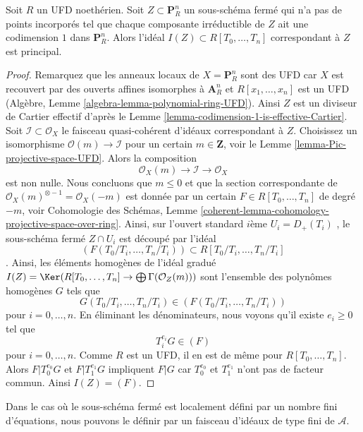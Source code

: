 \begin{lemma}
\label{lemma-equation-codim-1-in-projective-space}
Soit  $R$  un UFD noethérien. Soit  $Z \subset \mathbf{P}^n_R$  un sous-schéma fermé qui
n'a pas de points incorporés tel que chaque composante irréductible de
 $Z$  ait une codimension  $1$  dans  $\mathbf{P}^n_R$. Alors l'idéal
 $I(Z) \subset R[T_0, \ldots, T_n]$  correspondant à  $Z$  est principal.
\end{lemma}

\begin{proof}
Remarquez que les anneaux locaux de  $X = \mathbf{P}^n_R$  sont des UFD car  $X$  est
recouvert par des ouverts affines isomorphes à  $\mathbf{A}^n_R$  et  $R[x_1, \ldots, x_n]$  est un
UFD (Algèbre, Lemme  \ref{algebra-lemma-polynomial-ring-UFD}). Ainsi  $Z$  est un diviseur de Cartier
effectif d'après le Lemme  \ref{lemma-codimension-1-is-effective-Cartier}. Soit  $\mathcal{I} \subset \mathcal{O}_X$  le faisceau
quasi-cohérent d'idéaux correspondant à  $Z$. Choisissez un isomorphisme
 $\mathcal{O}(m) \to \mathcal{I}$  pour un certain  $m \in \mathbf{Z}$, voir le Lemme  \ref{lemma-Pic-projective-space-UFD}. Alors la
composition
$$
\mathcal{O}_X(m) \to \mathcal{I} \to \mathcal{O}_X
$$
est non nulle. Nous concluons que  $m \leq 0$  et que la section correspondante de
 $\mathcal{O}_X(m)^{\otimes -1} = \mathcal{O}_X(-m)$  est donnée par un certain  $F \in R[T_0, \ldots, T_n]$  de degré  $-m$, voir
Cohomologie des Schémas, Lemme  \ref{coherent-lemma-cohomology-projective-space-over-ring}. Ainsi, sur l'ouvert standard
 $i$ème  $U_i = D_+(T_i)$ , le sous-schéma fermé  $Z \cap U_i$  est découpé par
l'idéal
$$
(F(T_0/T_i, \ldots, T_n/T_i)) \subset R[T_0/T_i, \ldots, T_n/T_i]
$$
. Ainsi, les éléments homogènes de l'idéal gradué  $I(Z) = \Ker(R[T_0, \ldots, T_n] \to \bigoplus \Gamma(\mathcal{O}_Z(m)))$  sont l'ensemble des
polynômes homogènes  $G$  tels que
$$
G(T_0/T_i, \ldots, T_n/T_i) \in (F(T_0/T_i, \ldots, T_n/T_i))
$$
pour  $i = 0, \ldots, n$. En éliminant les dénominateurs, nous voyons qu'il existe
 $e_i \geq 0$  tel que
$$
T_i^{e_i}G \in (F)
$$
pour  $i = 0, \ldots, n$. Comme  $R$  est un UFD, il en est de même pour
 $R[T_0, \ldots, T_n]$. Alors  $F | T_0^{e_0}G$  et  $F | T_1^{e_1}G$  impliquent  $F | G$  car
 $T_0^{e_0}$  et  $T_1^{e_1}$  n'ont pas de facteur commun. Ainsi  $I(Z) = (F)$.
\end{proof}

\noindent
Dans le cas où le sous-schéma fermé est localement défini par un nombre fini
d'équations, nous pouvons le définir par un faisceau d'idéaux de type fini de
 $\mathcal{A}$.


